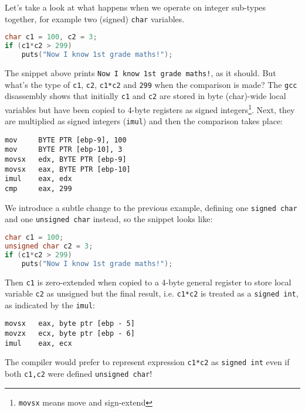 \begin{exmp}

Let's take a look at what happens when we operate on integer sub-types together, for example two (signed) \texttt{char} variables.
\begin{lstlisting}[language=c]
char c1 = 100, c2 = 3;
if (c1*c2 > 299)
	puts("Now I know 1st grade maths!");
\end{lstlisting}
The snippet above prints \texttt{Now I know 1st grade maths!}, as it should. But what's the type of \texttt{c1}, \texttt{c2}, \texttt{c1*c2} and \texttt{299} when the comparison is made? The \texttt{gcc} disassembly shows that initially \texttt{c1} and \texttt{c2} are stored in byte (char)-wide local variables but have been copied to 4-byte registers as signed integers\footnote{\texttt{movsx} means move and sign-extend}.  Next, they are multiplied as signed integers (\texttt{imul}) and then the comparison takes place:
\begin{lstlisting}
mov     BYTE PTR [ebp-9], 100
mov     BYTE PTR [ebp-10], 3
movsx   edx, BYTE PTR [ebp-9]
movsx   eax, BYTE PTR [ebp-10]
imul    eax, edx
cmp     eax, 299
\end{lstlisting}
\qedblack
\end{exmp}

\begin{exmp}
We introduce a subtle change to the previous example, defining one \texttt{signed char} and one \texttt{unsigned char} instead, so the snippet looks like:
\begin{lstlisting}[language=c]
char c1 = 100;
unsigned char c2 = 3;
if (c1*c2 > 299)
	puts("Now I know 1st grade maths!");
\end{lstlisting}
Then \texttt{c1} is zero-extended when copied to a 4-byte general register to store local variable \texttt{c2} as unsigned but the final result, i.e. \texttt{c1*c2} is treated as a \texttt{signed int}, as indicated by the \texttt{imul}:
\begin{lstlisting}
movsx   eax, byte ptr [ebp - 5]
movzx   ecx, byte ptr [ebp - 6]
imul    eax, ecx
\end{lstlisting}
The compiler would prefer to represent expression \texttt{c1*c2} as \texttt{signed int} even if both \texttt{c1,c2} were defined \texttt{unsigned char}! \qedblack
\end{exmp}

